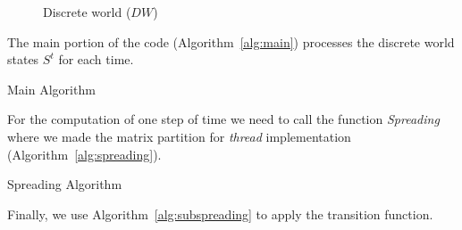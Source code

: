 \documentclass[conference]{IEEEtran}
\begin{document}
      \begin{figure}[!ht]
        \centering
        \resizebox{\columnwidth}{!}{
          
        }            
        \caption{Discrete world ($DW$)}
        \label{fig:discrete_world}
      \end{figure}

      The main portion of the code (Algorithm~\ref{alg:main}) processes the discrete world 
      states $S^t$ for each time.
      
      \begin{algorithm}[!ht]
        \begin{algorithmic}
          \EndFor
        \end{algorithmic}
        \caption{Main Algorithm}
        \label{alg:main}
      \end{algorithm}
      
      For the computation of one step of time we need to call the function \emph{Spreading} where we made 
      the matrix partition for \emph{thread} implementation (Algorithm~\ref{alg:spreading}).
      
      \begin{algorithm}[!ht]
        \begin{algorithmic}
              \Else
              \EndIf
            \EndFor
            \EndFor
          \EndProcedure
        \end{algorithmic}
        \caption{Spreading Algorithm}
        \label{alg:spreading}
      \end{algorithm}
      
      Finally, we use Algorithm~\ref{alg:subspreading} to apply the transition function.
      
\end{document}
